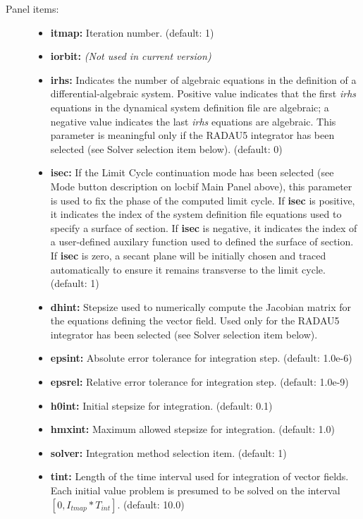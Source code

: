\begin{description}
\item[Panel items:]\mbox{}
	\begin{itemize}
	   \item {\bf itmap: } Iteration number.  (default: 1)
	   \item {\bf iorbit: }  {\em (Not used in current version)}
	   \item {\bf irhs: } Indicates the number of algebraic equations in the definition of a
	     differential-algebraic system.  Positive value indicates that the first {\em irhs} equations
	     in the dynamical system definition file are algebraic;  a negative value indicates the last
	     {\em irhs} equations are algebraic.  This parameter is meaningful only if the RADAU5 integrator
	     has been selected (see Solver selection item below). (default: 0)
	   \item {\bf isec: } If the Limit Cycle continuation mode has been selected (see Mode button 
	     description on locbif Main Panel above), this parameter is used to fix the phase of the
	     computed limit cycle.  If {\bf isec} is positive,  it indicates the index of the system definition
	     file equations used to specify a surface of section.  If {\bf isec} is negative, it indicates
	     the index of a user-defined auxilary function used to defined the surface of section.  If 
	     {\bf isec} is zero, a secant plane will be initially chosen and traced automatically to 
	     ensure it remains transverse to the limit cycle.  (default: 1)
	   \item {\bf dhint: } Stepsize used to numerically compute the Jacobian matrix for the equations
	     defining the vector field.  Used only for the RADAU5 integrator has been selected (see Solver
	     selection item below).  
	   \item {\bf epsint: } Absolute error tolerance for integration step. (default: 1.0e-6)
	   \item {\bf epsrel: } Relative error tolerance for integration step. (default: 1.0e-9)
	   \item {\bf h0int: } Initial stepsize for integration. (default: 0.1)
	   \item {\bf hmxint: } Maximum allowed stepsize for integration.  (default: 1.0)
	   \item {\bf solver: } Integration method selection item.  (default: 1)
	   \item {\bf tint: } Length of the time interval used for integration of vector fields.
	     Each initial value problem is presumed to be solved on the interval $[0,I_{tmap}*T_{int}]$.
	     (default: 10.0)
        \end{itemize}
\end{description}

